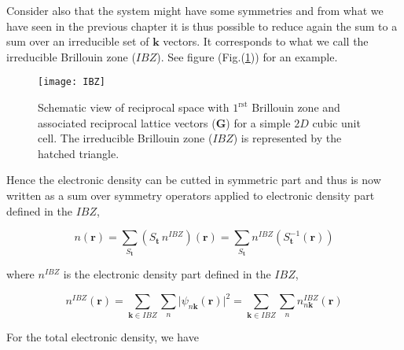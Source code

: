 \documentclass[a4paper,12pt]{report}
\begin{document}
Consider also that the system might have some symmetries and from what we have seen in the previous chapter it is thus possible to reduce again the sum to a sum over an irreducible set of $\mathbf{k}$ vectors. It corresponds to what we call the irreducible Brillouin zone ($IBZ$). See figure (Fig.(\ref{fig_IBZ})) for an example.\\

\begin{figure}[!t]
\centering
\begin{minipage}[c]{0.45\textwidth}
\texttt{[image: IBZ]}
\end{minipage}
\vspace{0.1\textwidth}
\begin{minipage}[c]{0.8\textwidth}
\caption{\small Schematic view of reciprocal space with $1^{\text{rst}}$ Brillouin zone and associated reciprocal lattice vectors ($\mathbf{G}$) for a simple $2D$ cubic unit cell. The irreducible Brillouin zone ($IBZ$) is represented by the hatched triangle.}
\vspace*{0.5ex}
\label{fig_IBZ}
\end{minipage}
\end{figure}

Hence the electronic density can be cutted in symmetric part and thus is now written as a sum over symmetry operators applied to electronic density part defined in the $IBZ$,

\begin{equation}
n(\mathbf{r}) = \sum_{S_{\mathbf{t}}} \left( S_{\mathbf{t}}\, n^{IBZ} \right) (\mathbf{r}) = \sum_{S_{\mathbf{t}}} n^{IBZ} \left(S_{\mathbf{t}}^{-1}(\mathbf{r})\right) \label{eqnIBZr}
\end{equation}

where $n^{IBZ}$ is the electronic density part defined in the $IBZ$,

\begin{equation}
n^{IBZ}(\mathbf{r}) = \sum_{\mathbf{k} \in IBZ} \sum_n \vert \psi_{n\mathbf{k}}(\mathbf{r}) \vert^2 = \sum_{\mathbf{k} \in IBZ} \sum_n n^{IBZ}_{n\mathbf{k}}(\mathbf{r})
\end{equation}

For the total electronic density, we have
\end{document}
